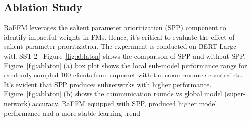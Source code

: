 % 



\subsection{Ablation Study}
RaFFM leverages the salient parameter prioritization (SPP) component to identify impactful weights in FMs. Hence, it's critical to evaluate the effect of salient parameter prioritization. The experiment is conducted on BERT-Large with SST-2~\citep{wang2018glue}
Figure~\ref{fig:ablaton} shows the comparison of SPP and without SPP. Figure~\ref{fig:ablaton} (a) box plot shows the local sub-model performance range for randomly sampled 100 clients from supernet with the same resource constraints. It's evident that SPP produces subnetworks with higher performance.
Figure~\ref{fig:ablaton} (b) shows the communication rounds vs global model (super-network) accuracy. RaFFM equipped with SPP, produced higher model performance and a more stable learning trend.

\label{sec:ad_algo}

